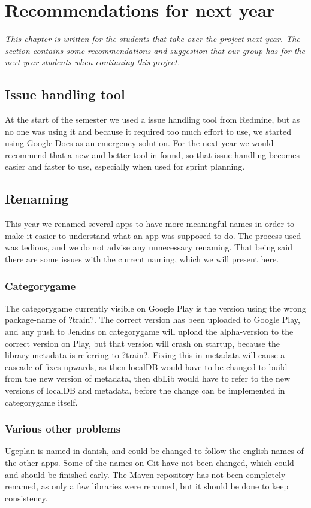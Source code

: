 \chapter{Recommendations for next year}
\textit{This chapter is written for the students that take over the project next year. The section contains some recommendations and suggestion that our group has for the next year students when continuing this project.}

\section{Issue handling tool}
At the start of the semester we used a issue handling tool from Redmine, but as no one was using it and because it required too much effort to use, we started using Google Docs as an emergency solution. For the next year we would recommend that a new and better tool in found, so that issue handling becomes easier and faster to use, especially when used for sprint planning.

\section{Renaming}
This year we renamed several apps to have more meaningful names in order to make it easier to understand what an app was supposed to do. The process used was tedious, and we do not advise any unnecessary renaming. That being said there are some issues with the current naming, which we will present here.

\subsection{Categorygame}
The categorygame currently visible on Google Play is the version using the wrong package-name of ?train?. The correct version has been uploaded to Google Play, and any push to Jenkins on categorygame will upload the alpha-version to the correct version on Play, but that version will crash on startup, because the library metadata is referring to ?train?. Fixing this in metadata will cause a cascade of fixes upwards, as then localDB would have to be changed to build from the new version of metadata, then dbLib would have to refer to the new versions of localDB and metadata, before the change can be implemented in categorygame itself.

\subsection{Various other problems}
Ugeplan is named in danish, and could be changed to follow the english names of the other apps.
Some of the names on Git have not been changed, which could and should be finished early.
The Maven repository has not been completely renamed, as only a few libraries were renamed, but it should be done to keep consistency.

